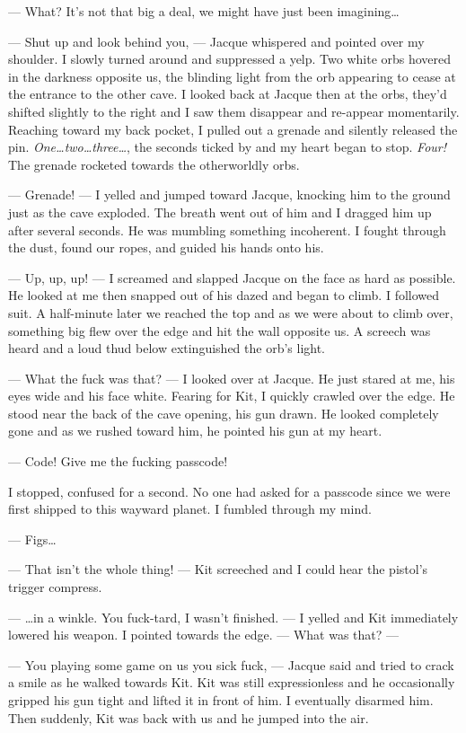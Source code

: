 --- What? It's not that big a deal, we might have just been imagining\dots

--- Shut up and look behind you, --- Jacque whispered and pointed over my shoulder. I slowly turned around and suppressed a yelp. Two white orbs hovered in the darkness opposite us, the blinding light from the orb appearing to cease at the entrance to the other cave. I looked back at Jacque then at the orbs, they'd shifted slightly to the right and I saw them disappear and re-appear momentarily. Reaching toward my back pocket, I pulled out a grenade and silently released the pin. \textit{One\dots two\dots three\dots }, the seconds ticked by and my heart began to stop. \textit{Four!} The grenade rocketed towards the otherworldly orbs.

--- Grenade! --- I yelled and jumped toward Jacque, knocking him to the ground just as the cave exploded. The breath went out of him and I dragged him up after several seconds. He was mumbling something incoherent. I fought through the dust, found our ropes, and guided his hands onto his. 

--- Up, up, up! --- I screamed and slapped Jacque on the face as hard as possible. He looked at me then snapped out of his dazed and began to climb. I followed suit. A half-minute later we reached the top and as we were about to climb over, something big flew over the edge and hit the wall opposite us. A screech was heard and a loud thud below extinguished the orb's light.

--- What the fuck was that? --- I looked over at Jacque. He just stared at me, his eyes wide and his face white. Fearing for Kit, I quickly crawled over the edge. He stood near the back of the cave opening, his gun drawn. He looked completely gone and as we rushed toward him, he pointed his gun at my heart.

--- Code! Give me the fucking passcode! 

I stopped, confused for a second. No one had asked for a passcode since we were first shipped to this wayward planet. I fumbled through my mind.

--- Figs\ldots{} 

--- That isn't the whole thing! --- Kit screeched and I could hear the pistol's trigger compress.

--- \ldots{}in a winkle. You fuck-tard, I wasn't finished. --- I yelled and Kit immediately lowered his weapon. I pointed towards the edge. --- What was that? --- 

--- You playing some game on us you sick fuck, --- Jacque said and tried to crack a smile as he walked towards Kit. Kit was still expressionless and he occasionally gripped his gun tight and lifted it in front of him. I eventually disarmed him. Then suddenly, Kit was back with us and he jumped into the air.

